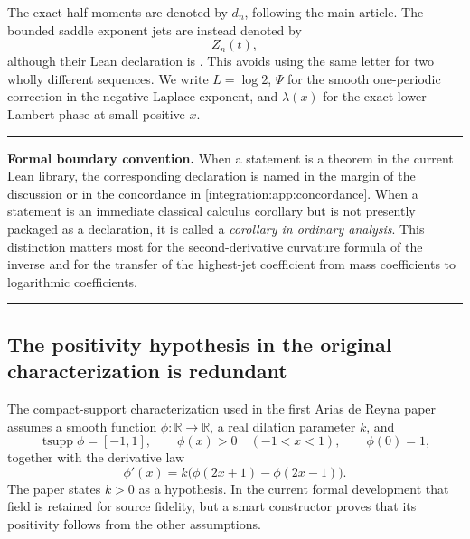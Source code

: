 \documentclass[11pt,oneside]{article}
\theoremstyle{definition}
\theoremstyle{remark}
\newcommand{\R}{\mathbb R}
\newenvironment{boxedremark}{%
  \par\smallskip\noindent\begin{center}\begin{minipage}{0.94\textwidth}%
  \color{black}\hrule\vspace{0.6em}\small
}{%
  \vspace{0.6em}\hrule\end{minipage}\end{center}\smallskip
}
\begin{document}
The exact half moments are denoted by $d_n$, following the main article.  The bounded saddle
exponent jets are instead denoted by
\begin{equation}
 Z_n(t),
 \label{integration:eq:Z-notation}
\end{equation}
although their Lean declaration is
.  This avoids using the same letter for two wholly
different sequences.  We write $L=\log 2$, $\Psi$ for the smooth one-periodic correction in
the negative-Laplace exponent, and $\lambda(x)$ for the exact lower-Lambert phase at small
positive $x$.

\begin{boxedremark}
\textbf{Formal boundary convention.}  When a statement is a theorem in the current Lean
library, the corresponding declaration is named in the margin of the discussion or in the
concordance in \cref{integration:app:concordance}.  When a statement is an immediate classical calculus
corollary but is not presently packaged as a declaration, it is called a \emph{corollary in
ordinary analysis}.  This distinction matters most for the second-derivative curvature
formula of the inverse and for the transfer of the highest-jet coefficient from mass
coefficients to logarithmic coefficients.
\end{boxedremark}

\subsection{The positivity hypothesis in the original characterization is redundant}
\label{integration:sec:scale-positive}

The compact-support characterization used in the first Arias de Reyna paper
\cite{integration:arias05442} assumes a smooth function $\phi:\R\to\R$, a real dilation
parameter $k$, and
\begin{equation}
 \operatorname{tsupp}\phi=[-1,1],\qquad
 \phi(x)>0\quad(-1<x<1),\qquad
 \phi(0)=1,
 \label{integration:eq:original-characterization-data}
\end{equation}
together with the derivative law
\begin{equation}
 \phi'(x)=k\bigl(\phi(2x+1)-\phi(2x-1)\bigr).
 \label{integration:eq:original-characterization-derivative}
\end{equation}
The paper states $k>0$ as a hypothesis.  In the current formal development that field is retained
for source fidelity, but a smart constructor proves that its positivity follows from the other
assumptions.
\end{document}
